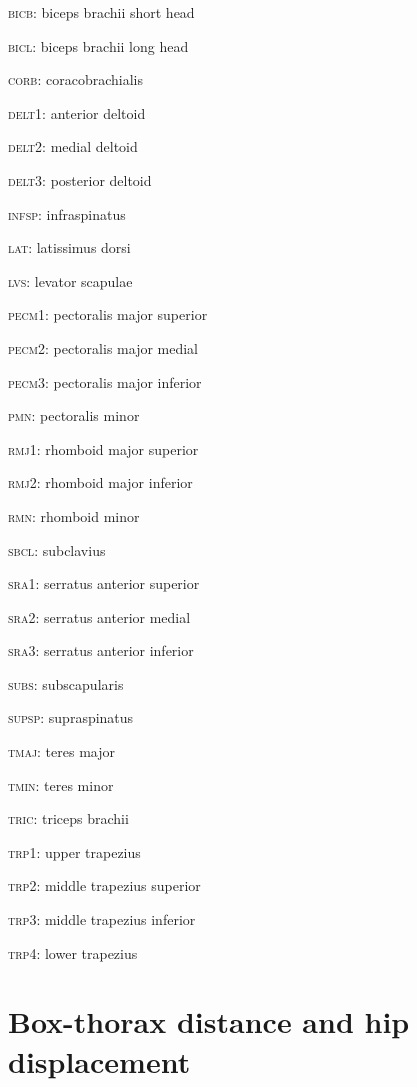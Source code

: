 \textsc{bicb}: biceps brachii short head

\textsc{bicl}: biceps brachii long head

\textsc{corb}: coracobrachialis

\textsc{delt}1: anterior deltoid

\textsc{delt}2: medial deltoid

\textsc{delt}3: posterior deltoid

\textsc{infsp}: infraspinatus

\textsc{lat}: latissimus dorsi

\textsc{lvs}: levator scapulae

\textsc{pecm}1: pectoralis major superior

\textsc{pecm}2: pectoralis major medial

\textsc{pecm}3: pectoralis major inferior

\textsc{pmn}: pectoralis minor

\textsc{rmj}1: rhomboid major superior

\textsc{rmj}2: rhomboid major inferior

\textsc{rmn}: rhomboid minor

\textsc{sbcl}: subclavius

\textsc{sra}1: serratus anterior superior

\textsc{sra}2: serratus anterior medial

\textsc{sra}3: serratus anterior inferior

\textsc{subs}: subscapularis

\textsc{supsp}: supraspinatus

\textsc{tmaj}: teres major

\textsc{tmin}: teres minor

\textsc{tric}: triceps brachii

\textsc{trp}1: upper trapezius

\textsc{trp}2: middle trapezius superior

\textsc{trp}3: middle trapezius inferior

\textsc{trp}4: lower trapezius

\section{Box-thorax distance and hip displacement}\label{sec:box-thorax-distance-and-hip-displacement}


